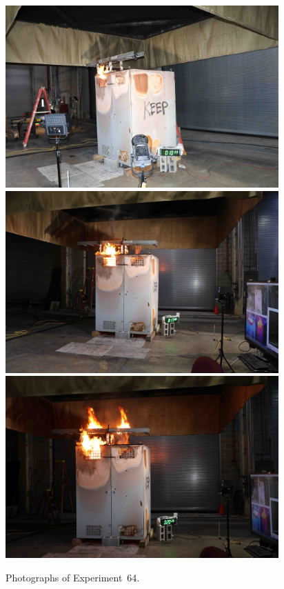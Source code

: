 \begin{figure}[p]
\centering
\includegraphics[height=2.75in]{../FIGURES/Test_64_10_min_39_s} \\
\includegraphics[height=2.75in]{../FIGURES/Test_64_17_min_8_s} \\
\includegraphics[height=2.75in]{../FIGURES/Test_64_20_min_26_s}
\caption[Photographs of Experiment~64]{Photographs of Experiment~64.}
\label{fig:Test_64_photos}
\end{figure}




